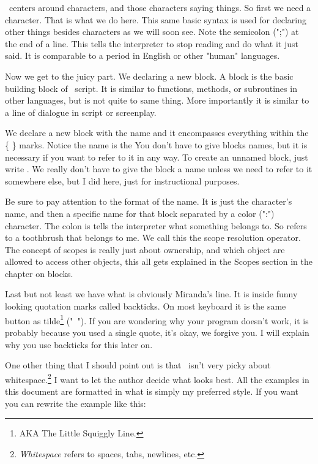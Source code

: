  \SSquared\ centers around characters, and those characters saying things.  So first we need a character.  That is what we do here.  This same basic syntax is used for declaring other things besides characters as we will soon see.  Note the semicolon (";") at the end of a line.  This tells the interpreter to stop reading and do what it just said.  It is comparable to a period in English or other "human" languages.

 Now we get to the juicy part.  We declaring a new block.  A block is the basic building block of \SSquared\ script.  It is similar to functions, methods, or subroutines in other languages, but is not quite to same thing.  More importantly it is similar to a line of dialogue in script or screenplay. 

We declare a new block with the name and it encompasses everything within the \{ \} marks.  Notice the name is the You don't have to give blocks names, but it is necessary if you want to refer to it in any way.  To create an unnamed block, just write .  We really don't have to give the block a name unless we need to refer to it somewhere else, but I did here, just for instructional purposes.

Be sure to pay attention to the format of the name.  It is just the character's name, and then a specific name for that block separated by a color (":") character.  The colon is tells the interpreter what something belongs to.  So  refers to a toothbrush that belongs to me.  We call this the scope resolution operator.  The concept of scopes is really just about ownership, and which object are allowed to access other objects, this all gets explained in the Scopes section in the chapter on blocks.

 Last but not least we have what is obviously Miranda's line.  It is inside funny looking quotation marks called backticks. On most keyboard it is the same button as tilde\footnote{AKA The Little Squiggly Line.} ("~"). If you are wondering why your program doesn't work, it is probably because you used a single quote, it's okay, we forgive you.  I will explain why you use backticks for this later on.

One other thing that I should point out is that \SSquared\ isn't very picky about whitespace.\footnote{\emph{Whitespace} refers to spaces, tabs, newlines, etc.}  I want to let the author decide what looks best.  All the examples in this document are formatted in what is simply my preferred style.  If you want you can rewrite the example like this:


